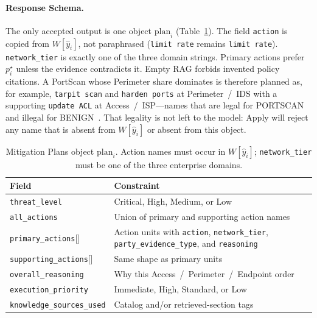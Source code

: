 \documentclass[10pt, conference]{IEEEtran}
\begin{document}
\paragraph{Response Schema.}
The only accepted output is one object $\mathrm{plan}_i$ (Table~\ref{tab:plan-schema}). The field \texttt{action} is copied from $W[\hat{y}_i]$, not paraphrased (\texttt{limit rate} remains \texttt{limit rate}). \texttt{network\_tier} is exactly one of the three domain strings. Primary actions prefer $p_i^{\star}$ unless the evidence contradicts it. Empty RAG forbids invented policy citations. A PortScan whose Perimeter share dominates is therefore planned as, for example, \texttt{tarpit scan} and \texttt{harden ports} at Perimeter~/~IDS with a supporting \texttt{update ACL} at Access~/~ISP---names that are legal for PORTSCAN and illegal for BENIGN~\cite{sharafaldin2018}. That legality is not left to the model: Apply will reject any name that is absent from $W[\hat{y}_i]$ or absent from this object.


\begin{table}[t]
\caption{Mitigation Plans object $\mathrm{plan}_i$. Action names must occur in $W[\hat{y}_i]$; \texttt{network\_tier} must be one of the three enterprise domains.}
\label{tab:plan-schema}
\centering
\small
\setlength{\tabcolsep}{4pt}
\renewcommand{\arraystretch}{1.1}
\begin{tabularx}{\columnwidth}{@{}>{\RaggedRight\arraybackslash}p{}>{\RaggedRight\arraybackslash}X@{}}
\toprule
\textbf{Field} & \textbf{Constraint} \\
\midrule
\texttt{threat\_\allowbreak level} & Critical, High, Medium, or Low \\
\texttt{all\_\allowbreak actions} & Union of primary and supporting action names \\
\texttt{primary\_\allowbreak actions}[] & Action units with \texttt{action}, \texttt{network\_\allowbreak tier}, \texttt{party\_\allowbreak evidence\_\allowbreak type}, and \texttt{reasoning} \\
\texttt{supporting\_\allowbreak actions}[] & Same shape as primary units \\
\texttt{overall\_\allowbreak reasoning} & Why this Access~/~Perimeter~/~Endpoint order \\
\texttt{execution\_\allowbreak priority} & Immediate, High, Standard, or Low \\
\texttt{knowledge\_\allowbreak sources\_\allowbreak used} & Catalog and/or retrieved-section tags \\
\bottomrule
\end{tabularx}
\end{table}
\end{document}
